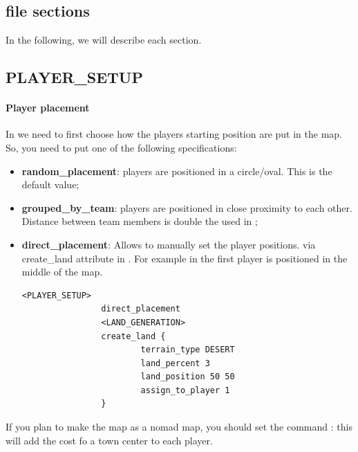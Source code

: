 \begin{appendices}
    \section{ file sections}

    In the following, we will describe each section. 

    \subsection{PLAYER\_SETUP}

    \paragraph{Player placement}

    In  we need to first choose how the players starting position are put in the map. So, you need to put one of the following specifications:

    \begin{itemize}
        \item \textbf{random\_placement}: players are positioned in a circle/oval. This is the default value;
        \item \textbf{grouped\_by\_team}: players are positioned in close proximity to each other. Distance between team members is double the  used in ;
        \item \textbf{direct\_placement}: Allows to manually set the player positions. via create\_land attribute in . For example in  the first player is positioned in the middle of the map.
        
            \begin{lstlisting}[language=rms,label=rms:manualposition]
                <PLAYER_SETUP>
                direct_placement
                <LAND_GENERATION>
                create_land {
                        terrain_type DESERT
                        land_percent 3
                        land_position 50 50
                        assign_to_player 1
                }
            \end{lstlisting}
        
    \end{itemize}

    If you plan to make the map as a nomad map, you should set the command : this will add the cost fo a town center to each player.


\end{appendices}
